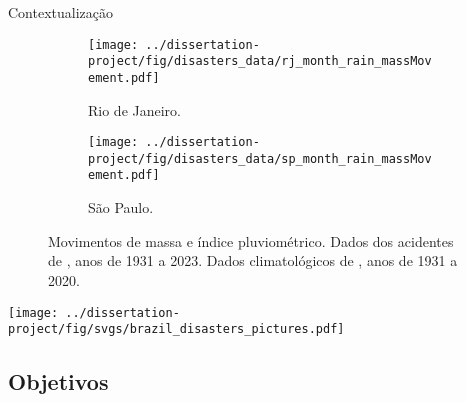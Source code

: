 \begin{frame}{Contextualização}
    \begin{figure}
        \centering
        \begin{subfigure}{0.45\textwidth}
            \centering
            \texttt{[image: ../dissertation-project/fig/disasters\_data/rj\_month\_rain\_massMovement.pdf]}
            \caption{Rio de Janeiro.}
            \label{fig:rj}
        \end{subfigure}
        \hfill
        \begin{subfigure}{0.45\textwidth}
            \centering
            \texttt{[image: ../dissertation-project/fig/disasters\_data/sp\_month\_rain\_massMovement.pdf]}
            \caption{São Paulo.}
            \label{fig:sp}
        \end{subfigure}
        \caption{Movimentos de massa e índice pluviométrico. Dados dos acidentes de \cite{atlas_brazil_2023}, anos de 1931 a 2023. Dados climatológicos de \cite{ANA}, anos de 1931 a 2020.}
        \label{fig:test}
    \end{figure}
\end{frame}


\begin{frame}
    \begin{minipage}[c]{0.6\textwidth}
        \centering
        \texttt{[image: ../dissertation-project/fig/svgs/brazil\_disasters\_pictures.pdf]}
    \end{minipage}
    \hfill
    \begin{minipage}[c]{0.38\textwidth}
    \end{minipage}
\end{frame}

\subsection{Objetivos}


